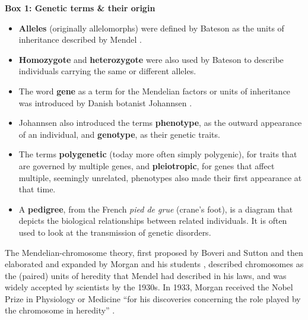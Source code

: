 \begin{Comment}
\hspace{-2.5mm}\textbf{Box 1: Genetic terms \& their origin}\label{box:genetic_terms}
\small
\begin{itemize}
    \item \textbf{Alleles} (originally allelomorphs) were defined by Bateson as the units of inheritance described by Mendel \cite{bateson2013mendel}.
    \item \textbf{Homozygote} and \textbf{heterozygote} were also used by Bateson to describe individuals carrying the same or different alleles.
    \item The word \textbf{gene} as a term for the Mendelian factors or units of inheritance was introduced by Danish botanist Johannsen \cite{johannsen1911genotype}. 
    \item Johannsen also introduced the terms \textbf{phenotype}, as the outward appearance of an individual, and \textbf{genotype}, as their genetic traits. 
    \item The terms \textbf{polygenetic} (today more often simply polygenic), for traits that are governed by multiple genes, 
    and \textbf{pleiotropic}, for genes that affect multiple, seemingly unrelated, phenotypes 
    also made their first appearance at that time. 
    \item A \textbf{pedigree}, from the French \textit{pied de grue} (crane's foot), is a diagram that depicts the biological relationships between related individuals.
    It is often used to look at the transmission of genetic disorders.
\end{itemize}
\vspace{3mm}
\end{Comment}

\vspace{3mm}

The Mendelian-chromosome theory, first proposed by Boveri and Sutton \cite{sutton1903chromosomes} and then elaborated and expanded by Morgan and his students \cite{morgan1915mechanism}, described chromosomes as the (paired) units of heredity that Mendel had described in his laws, and was widely accepted by scientists by the 1930s. 
In 1933, Morgan received the Nobel Prize in Physiology or Medicine “for his discoveries concerning the role played by the chromosome in heredity” \cite{nobel1933nobel}.\\

